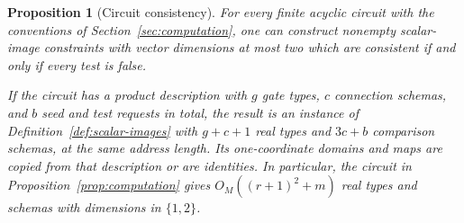 \documentclass[11pt]{article}
\newtheorem{proposition}[theorem]{Proposition}
\theoremstyle{definition}
\begin{document}
\begin{proposition}[Circuit consistency]\label{prop:consistency}
For every finite acyclic circuit with the conventions of
Section~\ref{sec:computation}, one can construct nonempty scalar-image
constraints with vector dimensions at most two which are consistent if
and only if every test is false.

If the circuit has a product description with $g$ gate types, $c$
connection schemas, and $b$ seed and test requests in total, the result is
an instance of Definition~\ref{def:scalar-images} with $g+c+1$
real types and $3c+b$ comparison schemas, at the same address length.
Its one-coordinate domains and maps are copied from that description or
are identities. In particular, the circuit in
Proposition~\ref{prop:computation} gives
$O_M((r+1)^2+m)$ real types and schemas with dimensions in $\{1,2\}$.
\end{proposition}
\end{document}
